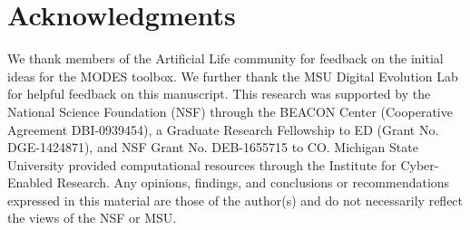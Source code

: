 \documentclass[letterpaper]{article}
\begin{document}
\section{Acknowledgments}
We thank members of the Artificial Life community for feedback on the initial ideas for the MODES toolbox.  We further thank the MSU Digital Evolution Lab for helpful feedback on this manuscript. This research was supported by the National Science Foundation (NSF) through the BEACON Center (Cooperative Agreement DBI-0939454), a Graduate Research Fellowship to ED (Grant No. DGE-1424871), and NSF Grant No. DEB-1655715 to CO. Michigan State University provided computational resources through the Institute for Cyber-Enabled Research. Any opinions, findings, and conclusions or recommendations expressed in this material are those of the author(s) and do not necessarily reflect the views of the NSF or MSU.



\end{document}
